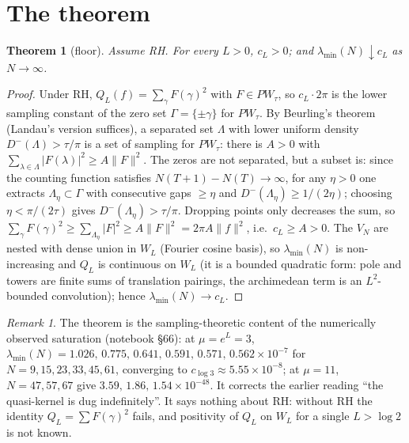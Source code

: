 \documentclass[11pt]{article}
\newtheorem{theorem}{Theorem}\newtheorem{proposition}[theorem]{Proposition}
\theoremstyle{remark}\newtheorem*{remark}{Remark}
\begin{document}
\section{The theorem}
\begin{theorem}[floor]\label{th1}
Assume RH. For every $L>0$, $c_L>0$; and $\lambda_{\min}(N)\downarrow c_L$ as $N\to\infty$.
\end{theorem}
\begin{proof}
Under RH, $Q_L(f)=\sum_\gamma F(\gamma)^2$ with $F\in PW_\tau$, so $c_L\cdot 2\pi$ is the lower sampling constant of the zero set $\Gamma=\{\pm\gamma\}$ for $PW_\tau$. By Beurling's theorem (Landau's version suffices), a separated set $\Lambda$ with lower uniform density $D^-(\Lambda)>\tau/\pi$ is a set of sampling for $PW_\tau$: there is $A>0$ with $\sum_{\lambda\in\Lambda}|F(\lambda)|^2\ge A\|F\|^2$. The zeros are not separated, but a subset is: since the counting function satisfies $N(T+1)-N(T)\to\infty$, for any $\eta>0$ one extracts $\Lambda_\eta\subset\Gamma$ with consecutive gaps $\ge\eta$ and $D^-(\Lambda_\eta)\ge 1/(2\eta)$; choosing $\eta<\pi/(2\tau)$ gives $D^-(\Lambda_\eta)>\tau/\pi$. Dropping points only decreases the sum, so $\sum_\gamma F(\gamma)^2\ge\sum_{\Lambda_\eta}|F|^2\ge A\|F\|^2=2\pi A\|f\|^2$, i.e.\ $c_L\ge A>0$. The $V_N$ are nested with dense union in $W_L$ (Fourier cosine basis), so $\lambda_{\min}(N)$ is non-increasing and $Q_L$ is continuous on $W_L$ (it is a bounded quadratic form: pole and towers are finite sums of translation pairings, the archimedean term is an $L^2$-bounded convolution); hence $\lambda_{\min}(N)\to c_L$.
\end{proof}
\begin{remark}
The theorem is the sampling-theoretic content of the numerically observed saturation (notebook \S66): at $\mu=e^L=3$, $\lambda_{\min}(N)=1.026,\,0.775,\,0.641,\,0.591,\,0.571,\,0.562\times10^{-7}$ for $N=9,15,23,33,45,61$, converging to $c_{\log 3}\approx5.55\times10^{-8}$; at $\mu=11$, $N=47,57,67$ give $3.59,\,1.86,\,1.54\times10^{-48}$. It corrects the earlier reading ``the quasi-kernel is dug indefinitely''. It says nothing about RH: without RH the identity $Q_L=\sum F(\gamma)^2$ fails, and positivity of $Q_L$ on $W_L$ for a single $L>\log 2$ is not known.
\end{remark}
\end{document}
